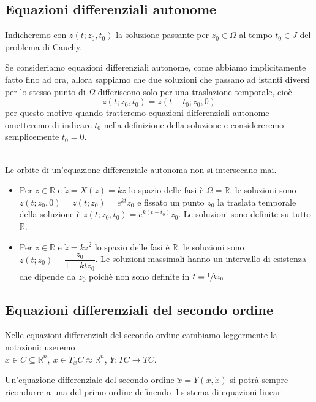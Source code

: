 \documentclass[11pt,a4paper,twoside]{book}
\newenvironment{proposizione}[1][\empty]{\begin{Proposizione}{
\ifx\empty#1\relax\else\mdseries\itshape#1\\\fi
}{}}{\end{Proposizione}}
\newenvironment{esempio}[1][Esempio]{ 
  \begin{center}\begin{tcolorbox}[
  title={#1:\\},
  width=0.9\linewidth,
  flush right,
  enhanced jigsaw, 
  colback=white, 
  frame hidden, 
  sharpish corners, arc=3mm,
  borderline west = {1pt}{0pt}{gray},
  borderline south = {1pt}{0pt}{gray},
  coltitle=black, 
  fonttitle=\small\bfseries, 
  attach title to upper, 
  breakable,
  top=2.5pt, bottom=0.3pt]\small
  }{
 \normalsize \end{tcolorbox}\end{center}
}
\theoremstyle{esss}
\theoremstyle{dotless}
\numberwithin{equation}{section} %
\begin{document}
\subsection{Equazioni differenziali autonome}
Indicheremo con $z(t;z_0,t_0)$ la soluzione passante per $z_0\in\Omega$ al tempo $t_0\in J$ del problema di Cauchy.

Se consideriamo equazioni differenziali autonome, come abbiamo implicitamente fatto fino ad ora, allora sappiamo che due soluzioni che passano ad istanti diversi per lo stesso punto di $\Omega$ differiscono solo per una traslazione temporale, cioè
\[ z(t;z_0,t_0)=z(t-t_0;z_0,0) \]
per questo motivo quando tratteremo equazioni differenziali autonome ometteremo di indicare $t_0$ nella definizione della soluzione e considereremo semplicemente $t_0=0$.

\begin{proposizione}
Le orbite di un'equazione differenziale autonoma non si intersecano mai.
\end{proposizione}

\begin{esempio}[Esempi di equazioni autonome scalari]
\begin{itemize}
\item Per $z\in\mathbb{R}$ e $\dot{z}=X(z)=kz$ lo spazio delle fasi è $\Omega=\mathbb{R}$, le soluzioni sono $z(t;z_0,0)=z(t;z_0)=e^{kt}z_0$ e fissato un punto $z_0$ la traslata temporale della soluzione è $z(t;z_0,t_0)=e^{k(t-t_0)}z_0$. Le soluzioni sono definite su tutto $\mathbb{R}$. 
\item Per $z\in\mathbb{R}$ e $\dot{z}=kz^2$ lo spazio delle fasi è $\mathbb{R}$, le soluzioni sono $z(t;z_0)=\dfrac{z_0}{1-ktz_0}$. Le soluzioni massimali hanno un intervallo di esistenza che dipende da $z_0$ poichè non sono definite in $t=\sfrac{1}{kz_0}$ 
\end{itemize}
\end{esempio}


\subsection{Equazioni differenziali del secondo ordine}
Nelle equazioni differenziali del secondo ordine cambiamo leggermente la notazioni: useremo\\ $x\in C \subseteq\mathbb{R}^n , \> \dot{x}\in T_x C \approx\mathbb{R}^n$, $Y:TC\rightarrow TC$.

Un'equazione differenziale del secondo ordine $\ddot{x}=Y(x,\dot{x})$ si potrà sempre ricondurre a una del primo ordine definendo il sistema di equazioni lineari
\end{document}
